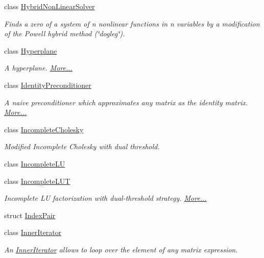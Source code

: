 \begin{DoxyCompactItemize}
class \hyperlink{class_eigen_1_1_hybrid_non_linear_solver}{Hybrid\+Non\+Linear\+Solver}
\begin{DoxyCompactList}\small\item\em Finds a zero of a system of n nonlinear functions in n variables by a modification of the Powell hybrid method (\char`\"{}dogleg\char`\"{}). \end{DoxyCompactList}\item 
class \hyperlink{group___geometry___module_class_eigen_1_1_hyperplane}{Hyperplane}
\begin{DoxyCompactList}\small\item\em A hyperplane.  \hyperlink{group___geometry___module_class_eigen_1_1_hyperplane}{More...}\end{DoxyCompactList}\item 
class \hyperlink{group___iterative_linear_solvers___module_class_eigen_1_1_identity_preconditioner}{Identity\+Preconditioner}
\begin{DoxyCompactList}\small\item\em A naive preconditioner which approximates any matrix as the identity matrix.  \hyperlink{group___iterative_linear_solvers___module_class_eigen_1_1_identity_preconditioner}{More...}\end{DoxyCompactList}\item 
class \hyperlink{class_eigen_1_1_incomplete_cholesky}{Incomplete\+Cholesky}
\begin{DoxyCompactList}\small\item\em Modified Incomplete Cholesky with dual threshold. \end{DoxyCompactList}\item 
class \hyperlink{class_eigen_1_1_incomplete_l_u}{Incomplete\+LU}
\item 
class \hyperlink{group___iterative_linear_solvers___module_class_eigen_1_1_incomplete_l_u_t}{Incomplete\+L\+UT}
\begin{DoxyCompactList}\small\item\em Incomplete LU factorization with dual-\/threshold strategy.  \hyperlink{group___iterative_linear_solvers___module_class_eigen_1_1_incomplete_l_u_t}{More...}\end{DoxyCompactList}\item 
struct \hyperlink{struct_eigen_1_1_index_pair}{Index\+Pair}
\item 
class \hyperlink{class_eigen_1_1_inner_iterator}{Inner\+Iterator}
\begin{DoxyCompactList}\small\item\em An \hyperlink{class_eigen_1_1_inner_iterator}{Inner\+Iterator} allows to loop over the element of any matrix expression. \end{DoxyCompactList}\item 

\end{DoxyCompactItemize}
